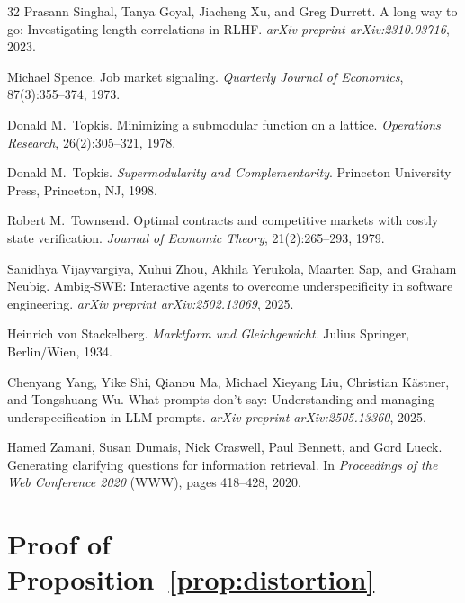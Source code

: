 \documentclass[11pt]{article}
\begin{document}
\begin{thebibliography}{32}
Prasann Singhal, Tanya Goyal, Jiacheng Xu, and Greg Durrett.
A long way to go: Investigating length correlations in RLHF.
\textit{arXiv preprint arXiv:2310.03716}, 2023.

Michael Spence. Job market signaling. \textit{Quarterly Journal of Economics},
87(3):355--374, 1973.

Donald M.\ Topkis. Minimizing a submodular function on a lattice.
\textit{Operations Research}, 26(2):305--321, 1978.

Donald M.\ Topkis. \textit{Supermodularity and Complementarity}.
Princeton University Press, Princeton, NJ, 1998.

Robert M.\ Townsend. Optimal contracts and competitive markets with costly state
verification. \textit{Journal of Economic Theory}, 21(2):265--293, 1979.

Sanidhya Vijayvargiya, Xuhui Zhou, Akhila Yerukola, Maarten Sap, and Graham Neubig.
Ambig-SWE: Interactive agents to overcome underspecificity in software engineering.
\textit{arXiv preprint arXiv:2502.13069}, 2025.

Heinrich von Stackelberg. \textit{Marktform und Gleichgewicht}. Julius Springer, Berlin/Wien, 1934.

Chenyang Yang, Yike Shi, Qianou Ma, Michael Xieyang Liu, Christian K{\"a}stner, and Tongshuang Wu.
What prompts don't say: Understanding and managing underspecification in LLM prompts.
\textit{arXiv preprint arXiv:2505.13360}, 2025.

Hamed Zamani, Susan Dumais, Nick Craswell, Paul Bennett, and Gord Lueck.
Generating clarifying questions for information retrieval.
In \textit{Proceedings of the Web Conference 2020} (WWW),
pages 418--428, 2020.

\end{thebibliography}

\appendix
\section{Proof of Proposition~\ref{prop:distortion}}
\label{app:prop7}
\end{document}
